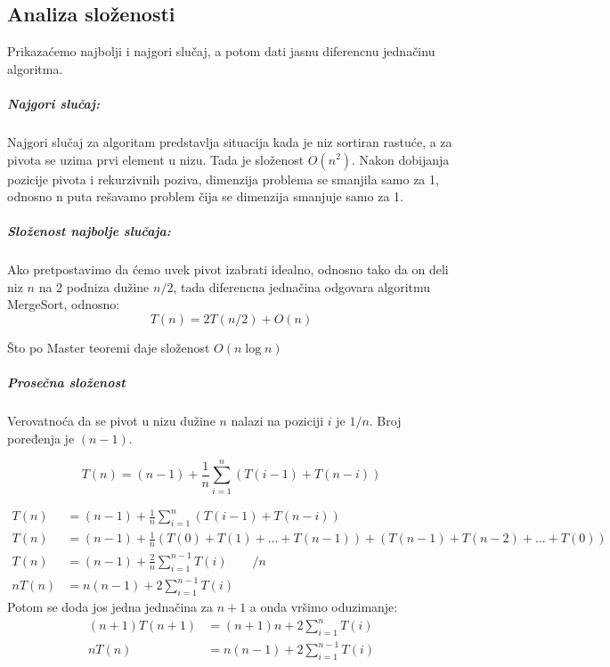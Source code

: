 \documentclass{memoir}
\begin{document}
\subsection{Analiza složenosti}
Prikazaćemo najbolji i najgori slučaj, a potom dati jasnu diferencnu jednačinu algoritma.

\subparagraph{Najgori slučaj:}  Najgori slučaj za algoritam predstavlja situacija kada je niz sortiran rastuće, a za pivota se uzima prvi element u nizu. Tada 
je složenost $ O(n^2) $. Nakon dobijanja pozicije pivota i rekurzivnih poziva, dimenzija problema se smanjila samo za 1, odnosno n puta rešavamo problem čija 
se dimenzija smanjuje samo za 1.

\subparagraph{Složenost najbolje slučaja:} Ako pretpostavimo da ćemo uvek pivot izabrati idealno, odnosno tako da on deli niz $n$ na 2 podniza dužine $n/2$, 
tada 
diferencna jednačina odgovara algoritmu MergeSort, odnosno:
$$ T(n) = 2T(n/2) + O(n) $$

Što po Master teoremi daje složenost $ O(n \log{n}) $

\subparagraph{Prosečna složenost}
Verovatnoća da se pivot u nizu dužine $n$ nalazi na poziciji $i$ je $ 1/n $. Broj poređenja je $(n-1)$.

$$ T(n) = (n - 1) + \frac{1}{n} \sum \limits_{i=1}^{n} (T(i - 1) + T(n - i)) $$


\begin{align*}
T(n)	&= (n - 1) + \frac{1}{n} \sum \limits_{i=1}^{n} (T(i - 1) + T(n - i))\\
T(n)	&= (n - 1) + \frac{1}{n} (T(0) + T(1) + ... + T(n-1)) + (T(n-1) + T(n-2) + ... + T(0)) \\
T(n)  &= (n - 1) + \frac{2}{n} \sum \limits_{i=1}^{n-1} T(i)	\qquad / n \\
n T(n) &= n(n-1) + 2 \sum \limits_{i=1}^{n-1} T(i)
\end{align*}
Potom se doda jos jedna jednačina za $n+1$ a onda vršimo oduzimanje:
\begin{align*}
(n+1) T(n+1) &= (n+1)n + 2 \sum \limits_{i=1}^{n} T(i) \\
n T(n) &= n(n-1) + 2 \sum \limits_{i=1}^{n-1} T(i)
\end{align*}
\end{document}
